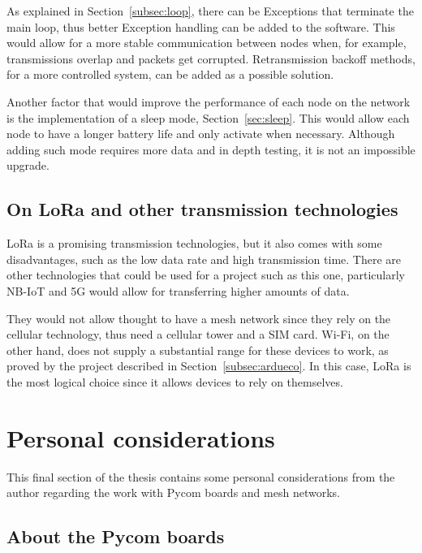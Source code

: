 			As explained in Section~\ref{subsec:loop}, there can be Exceptions that terminate the main loop, thus better Exception handling can be added to the software.
			This would allow for a more stable communication between nodes when, for example, transmissions overlap and packets get corrupted.
			Retransmission backoff methods, for a more controlled system, can be added as a possible solution.

			Another factor that would improve the performance of each node on the network is the implementation of a sleep mode, Section~\ref{sec:sleep}.
			This would allow each node to have a longer battery life and only activate when necessary.
			Although adding such mode requires more data and in depth testing, it is not an impossible upgrade.

		\subsection{On LoRa and other transmission technologies}\label{sec:other_transmission_methods}
		
			LoRa is a promising transmission technologies, but it also comes with some disadvantages, such as the low data rate and high transmission time.
			There are other technologies that could be used for a project such as this one, particularly NB-IoT and 5G would allow for transferring higher amounts of data.
			
			They would not allow thought to have a mesh network since they rely on the cellular technology, thus need a cellular tower and a SIM card.
			Wi-Fi, on the other hand, does not supply a substantial range for these devices to work, as proved by the project described in Section~\ref{subsec:ardueco}.
			In this case, LoRa is the most logical choice since it allows devices to rely on themselves.

	\section{Personal considerations}
	
		This final section of the thesis contains some personal considerations from the author regarding the work with Pycom boards and mesh networks.
	
		\subsection{About the Pycom boards}\label{sec:working_with_pycom}
		
